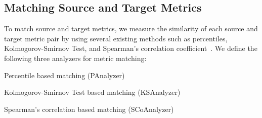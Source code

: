 \subsection{Matching Source and Target Metrics}
\label{sec:analyzers}

To match source and target metrics, we measure the similarity of each source and
target metric pair by using several existing methods such as percentiles,
Kolmogorov-Smirnov Test, and Spearman's correlation
coefficient~\cite{Massey51,Spearman10}.
We define the following three analyzers
for metric matching:
\squishlist
	\item Percentile based matching (PAnalyzer)
	\item Kolmogorov-Smirnov Test based matching (KSAnalyzer)
	\item Spearman's correlation based matching (SCoAnalyzer)
\squishend

% 
% 

